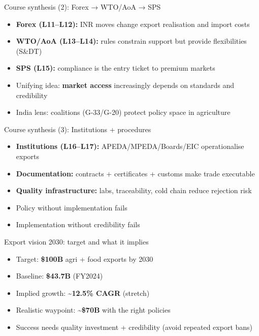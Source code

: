 \documentclass[
  ignorenonframetext,
  aspectratio=169,
]{beamer}
\makeatletter
\providecommand{\tightlist}{%
  \setlength{\itemsep}{0pt}\setlength{\parskip}{0pt}}
\let\quarto@originallabel\label
\DeclareRobustCommand*{\label}[1]{\quarto@originallabel{#1}}
\makeatother
\begin{document}
\begin{frame}
\begin{block}{Course synthesis (2): Forex → WTO/AoA → SPS}
\label{course-synthesis-2-forex-wtoaoa-sps}
\begin{itemize}
\tightlist
\item
  \textbf{Forex (L11--L12):} INR moves change export realisation and
  import costs
\item
  \textbf{WTO/AoA (L13--L14):} rules constrain support but provide
  flexibilities (S\&DT)
\item
  \textbf{SPS (L15):} compliance is the entry ticket to premium markets
\item
  Unifying idea: \textbf{market access} increasingly depends on
  standards and credibility
\item
  India lens: coalitions (G-33/G-20) protect policy space in agriculture
\end{itemize}
\end{block}
\end{frame}

\begin{frame}
\begin{block}{Course synthesis (3): Institutions + procedures}
\label{course-synthesis-3-institutions-procedures}
\begin{itemize}
\tightlist
\item
  \textbf{Institutions (L16--L17):} APEDA/MPEDA/Boards/EIC
  operationalise exports
\item
  \textbf{Documentation:} contracts + certificates + customs make trade
  executable
\item
  \textbf{Quality infrastructure:} labs, traceability, cold chain reduce
  rejection risk
\item
  Policy without implementation fails
\item
  Implementation without credibility fails
\end{itemize}
\end{block}
\end{frame}

\begin{frame}
\begin{block}{Export vision 2030: target and what it implies}
\label{export-vision-2030-target-and-what-it-implies}
\begin{itemize}
\tightlist
\item
  Target: \textbf{\$100B} agri + food exports by 2030
\item
  Baseline: \textbf{\$43.7B} (FY2024)
\item
  Implied growth: \textbf{\textasciitilde12.5\% CAGR} (stretch)
\item
  Realistic waypoint: \textbf{\textasciitilde\$70B} with the right
  policies
\item
  Success needs quality investment + credibility (avoid repeated export
  bans)
\end{itemize}
\end{block}
\end{frame}
\end{document}
